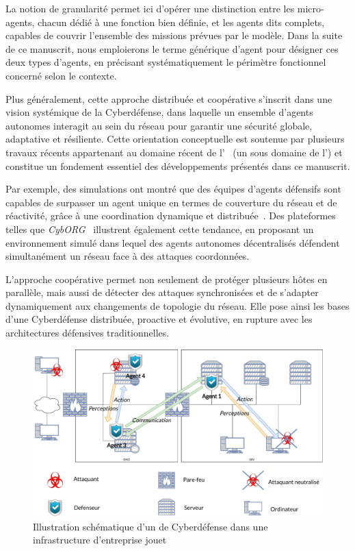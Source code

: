La notion de granularité permet ici d'opérer une distinction entre les micro-agents, chacun dédié à une fonction bien définie, et les agents  dits complets, capables de couvrir l'ensemble des missions prévues par le modèle. Dans la suite de ce manuscrit, nous emploierons le terme générique d'agent  pour désigner ces deux types d'agents, en précisant systématiquement le périmètre fonctionnel concerné selon le contexte.

Plus généralement, cette approche distribuée et coopérative s'inscrit dans une vision systémique de la Cyberdéfense, dans laquelle un ensemble d'agents autonomes interagit au sein du réseau pour garantir une sécurité globale, adaptative et résiliente. Cette orientation conceptuelle est soutenue par plusieurs travaux récents appartenant au domaine récent de l'~\cite{Vyas2023} (un sous domaine de l') et constitue un fondement essentiel des développements présentés dans ce manuscrit.

Par exemple, des simulations ont montré que des équipes d'agents défensifs sont capables de surpasser un agent unique en termes de couverture du réseau et de réactivité, grâce à une coordination dynamique et distribuée~\cite{RLResilientCyberdefense2024}.
Des plateformes telles que \textit{CybORG}~\cite{cage_challenge_3_announcement} illustrent également cette tendance, en proposant un environnement simulé dans lequel des agents autonomes décentralisés défendent simultanément un réseau face à des attaques coordonnées.

L'approche coopérative permet non seulement de protéger plusieurs hôtes en parallèle, mais aussi de détecter des attaques synchronisées et de s'adapter dynamiquement aux changements de topologie du réseau. Elle pose ainsi les bases d'une Cyberdéfense distribuée, proactive et évolutive, en rupture avec les architectures défensives traditionnelles.

\begin{figure}[h]
  \centering
  \includegraphics[width=\linewidth]{figures/infra_MAS_illustration.pdf}
  \caption{Illustration schématique d'un  de Cyberdéfense dans une infrastructure d'entreprise jouet}
  \label{fig:distributed_sma}
\end{figure}

